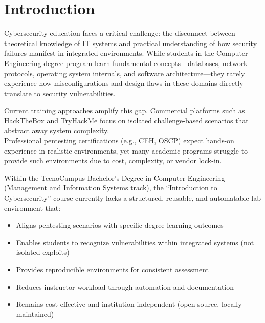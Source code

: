 
\chapter{Introduction}


Cybersecurity education faces a critical challenge: the disconnect between 
theoretical knowledge of IT systems and practical understanding of how 
security failures manifest in integrated environments. While students in 
the Computer Engineering degree program learn fundamental concepts---databases, 
network protocols, operating system internals, and software architecture---they 
rarely experience how misconfigurations and design flaws in these domains 
directly translate to security vulnerabilities.

Current training approaches amplify this gap. Commercial platforms such as 
HackTheBox\cite{hackthebox} and TryHackMe\cite{tryhackme} focus on isolated challenge-based scenarios that 
abstract away system complexity. \\ Professional pentesting certifications 
(e.g., CEH, OSCP\cite{ceh_framework,oscp_exam}) expect hands-on experience in realistic environments, yet 
many academic programs struggle to provide such environments due to cost, 
complexity, or vendor lock-in.

Within the TecnoCampus Bachelor's Degree in Computer Engineering 
(Management and Information Systems track), the ``Introduction to Cybersecurity'' 
course currently lacks a structured, reusable, and automatable lab environment that:

\begin{itemize}
    \item Aligns pentesting scenarios with specific degree learning outcomes
    \item Enables students to recognize vulnerabilities within integrated systems 
          (not isolated exploits)
    \item Provides reproducible environments for consistent assessment
    \item Reduces instructor workload through automation and documentation
    \item Remains cost-effective and institution-independent (open-source, 
          locally maintained)
\end{itemize}

